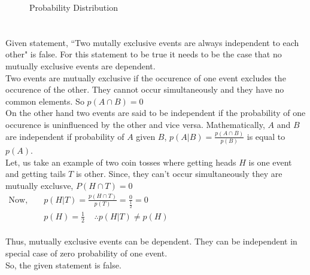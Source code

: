 \documentclass{article}
\begin{document}
{    \begin{center}
        \begin{figure}[H]
            \centering
        \caption{Probability Distribution}
        \end{figure}
    \end{center}



}

\newpage
\section{}

\Large{
    Given statement, ``Two mutally exclusive events are always independent to each other" is false. For this statement to be true it needs to be the case that
    no mutually exclusive events are dependent.\\

    Two events are mutually exclusive if the occurence of one event excludes the occurence of the other. They cannot occur simultaneously and they have no common elements. So $p(A\cap B) = 0$\\

    On the other hand two events are said to be independent if the probability of one occurence is uninfluenced by the other and vice versa.
    Mathematically, $A$ and $B$ are independent if probability of $A$ given $B$, $p(A|B) = \frac{p(A\cap B)}{p(B)}$ is equal to $p(A)$.\\

    Let, us take an example of two coin tosses where getting heads $H$ is one event and getting tails $T$ is other. Since, they can't occur simultaneously they are mutually exclusve, $P(H \cap T) = 0$\\

    \begin{eqnarray*}
        \text{Now, } &&p(H|T) = \frac{p(H\cap T)}{p(T)} = \frac{0}{\frac{1}{2}} = 0\hspace{10cm}\\
        &&p(H) = \frac{1}{2}\;\;\;\; \therefore p(H|T) \neq p(H)
    \end{eqnarray*}
    \\
    Thus, mutually exclusive events can be dependent. They can be independent in special case of zero probability of one event.\\

    So, the given statement is false.
}
\end{document}
